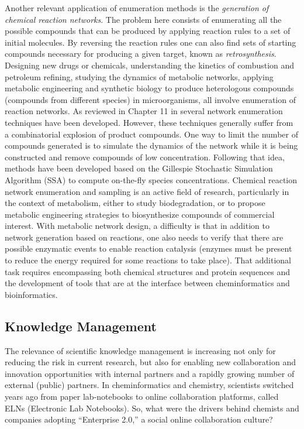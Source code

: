 \documentclass{sig-alternate}
\begin{document}
Another relevant application of enumeration methods is the
\emph{generation of chemical reaction networks}. The problem here
consists of enumerating all the possible compounds that can be
produced by applying reaction rules to a set of initial molecules. By
reversing the reaction rules one can also find sets of starting
compounds necessary for producing a given target, known as
\emph{retrosynthesis}. Designing new drugs or chemicals, understanding
the kinetics of combustion and petroleum refining, studying the
dynamics of metabolic networks, applying metabolic engineering and
synthetic biology to produce heterologous compounds (compounds from
different species) in microorganisms, all involve enumeration of
reaction networks. As reviewed in Chapter 11 in \cite{faulon2010}
several network enumeration techniques have been developed. However,
these techniques generally suffer from a combinatorial explosion of
product compounds. One way to limit the number of compounds generated
is to simulate the dynamics of the network while it is being
constructed and remove compounds of low concentration. Following that
idea, methods have been developed based on the Gillespie Stochastic
Simulation Algorithm (SSA) to compute on-the-fly species
concentrations. Chemical reaction network enumeration and sampling is
an active field of research, particularly in the context of
metabolism, either to study biodegradation, or to propose metabolic
engineering strategies to biosynthesize compounds of commercial
interest. With metabolic network design, a difficulty is that in
addition to network generation based on reactions, one also needs to
verify that there are possible enzymatic events to enable reaction
catalysis (enzymes must be present to reduce the
energy required for some reactions to take place). That additional
task requires encompassing both chemical structures and protein
sequences and the development of tools that are at the
interface between cheminformatics and bioinformatics.


\subsection{Knowledge Management}
\label{sec:knowledge-management}

The relevance of scientific knowledge management is increasing not
only for reducing the risk in current research, but also for enabling
new collaboration and innovation opportunities with internal partners and
a rapidly growing number of external (public) partners. In
cheminformatics and chemistry, scientists switched years ago
from paper lab-notebooks to online collaboration platforms, called
ELNs (Electronic Lab Notebooks). So, what were the drivers behind
chemists and companies adopting ``Enterprise 2.0,'' a social online
collaboration culture?
\end{document}
